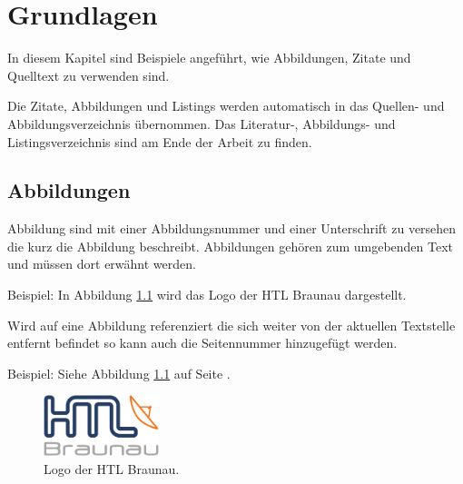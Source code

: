 


\chapter{Grundlagen}

In diesem Kapitel sind Beispiele angeführt, wie Abbildungen, Zitate und Quelltext zu verwenden sind.

Die Zitate, Abbildungen und Listings werden automatisch in das Quellen- und Abbildungsverzeichnis übernommen. 
Das Literatur-, Abbildungs- und Listingsverzeichnis sind am Ende der Arbeit zu finden.   

\section{Abbildungen}\label{ref:abbildungen}

Abbildung sind mit einer Abbildungsnummer und einer Unterschrift zu versehen die kurz die Abbildung beschreibt. 
Abbildungen gehören zum umgebenden Text und müssen dort erwähnt werden.

Beispiel: In Abbildung \ref{htl01} wird das Logo der HTL Braunau dargestellt.

Wird auf eine Abbildung referenziert die sich weiter von der aktuellen Textstelle entfernt befindet so kann auch die Seitennummer hinzugefügt werden.

Beispiel: Siehe Abbildung \ref{htl01} auf Seite \pageref{htl01}.


\begin{figure}[H]
	\centering
	\includegraphics[width=0.3\textwidth]{./media/images/htl_c_cmyk_rein.pdf}
  	\caption{Logo der HTL Braunau.}
  	\label{htl01}
\end{figure}


